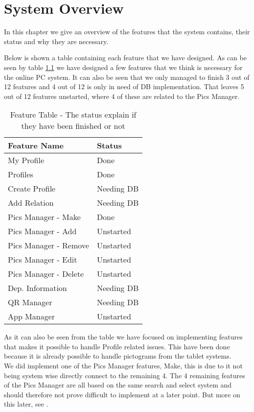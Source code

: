 \chapter{System Overview}
\label{chap:systemOverview}
In this chapter we give an overview of the features that the system contains, their status and why they are necessary.

Below is shown a table containing each feature that we have designed. As can be seen by table \ref{tab:FeatureTable} we have designed a few features that we think is necessary for the online PC system. It can also be seen that we only managed to finish 3 out of 12 features and 4 out of 12 is only in need of DB implementation. That leaves 5 out of 12 features unstarted, where 4 of these are related to the Pics Manager.

\begin{table}[htbp]
	\centering
		\begin{tabular}{|l|l|}
			\hline
			Feature Name & Status\\\hline
			My Profile & Done\\\hline
			Profiles & Done\\\hline
			Create Profile & Needing DB\\\hline
			Add Relation & Needing DB\\\hline
			Pics Manager - Make & Done\\\hline
			Pics Manager - Add & Unstarted\\\hline
			Pics Manager - Remove & Unstarted\\\hline
			Pics Manager - Edit & Unstarted\\\hline
			Pics Manager - Delete & Unstarted\\\hline
			Dep. Information & Needing DB\\\hline
			QR Manager & Needing DB\\\hline
			App Manager & Unstarted\\\hline
		\end{tabular}
	\caption{Feature Table - The status explain if they have been finished or not}
	\label{tab:FeatureTable}
\end{table}

As it can also be seen from the table we have focused on implementing features that makes it possible to handle Profile related issues. This have been done because it is already possible to handle pictograms from the tablet systems.\\
We did implement one of the Pics Manager features, Make, this is due to it not being system wise directly connect to the remaining 4. The 4 remaining features of the Pics Manager are all based on the same search and select system and should therefore not prove difficult to implement at a later point. But more on this later, see .


